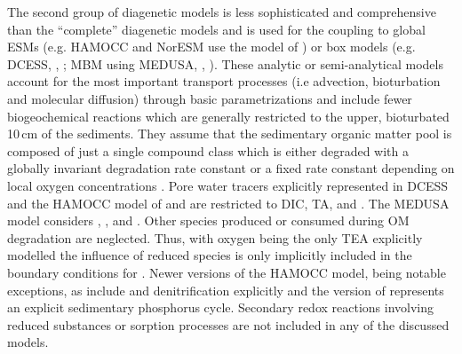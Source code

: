 \documentclass[gmd, manuscript]{copernicus}
\begin{document}
The second group of diagenetic models is less sophisticated and comprehensive than the ``complete'' diagenetic models and is used for the coupling 
to global ESMs (e.g. HAMOCC and NorESM use the model of \citet{heinze_global_1999}) or box models (e.g. DCESS, \citeauthor{shaffer_presentation_2008}, \citeyear{shaffer_presentation_2008}; 
MBM using MEDUSA, \citeauthor{munhoven_glacialinterglacial_2007}, \citeyear{munhoven_glacialinterglacial_2007}). 
These analytic or semi-analytical models  account for the most important transport processes (i.e advection, bioturbation and molecular diffusion) through basic parametrizations and 
include fewer biogeochemical reactions which are generally restricted to the upper, bioturbated 10\,cm of the sediments. 
They assume that the sedimentary organic matter pool is composed of just a single compound class which is either degraded with a globally invariant degradation rate constant 
\citep[][]{munhoven_glacialinterglacial_2007} or a fixed rate constant depending on local oxygen concentrations \citep{shaffer_presentation_2008, palastanga_long_term_2011}. 
Pore water tracers explicitly represented in DCESS \citep{shaffer_presentation_2008} and the HAMOCC model of \citet{heinze_global_1999} and \citet{palastanga_long_term_2011} 
are restricted to DIC, TA,  and . The MEDUSA model \citep{munhoven_glacialinterglacial_2007} considers , ,  and . 
Other species produced or consumed during OM degradation are neglected. 
Thus, with oxygen being the only TEA explicitly modelled the influence of reduced species is only implicitly included in the boundary conditions for . 
Newer versions of the HAMOCC model, being notable exceptions, as \citet{ilyina_global_2013} include  and denitrification explicitly and the version of 
\citet{palastanga_long_term_2011} represents an explicit sedimentary phosphorus cycle. Secondary redox reactions involving reduced substances or sorption processes are not 
included in any of the discussed models. 

\end{document}
